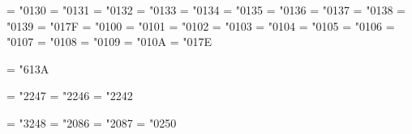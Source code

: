 


\def\daghex  {86}  %
\def\ddaghex {87}
\def\Shex    {A7}
\def\Phex    {B6}
\def\barhex  {16}
\def\gravehex{12}
\def\acutehex{13}
\def\checkhex{14}
\def\brevehex{15}
\def\hathex  {5E}
\def\dothex  {05}
\def\tildehex{7E}
\def\ddothex {7F}



\mathchardef\Gamma         = "0130
\mathchardef\Delta         = "0131
\mathchardef\Theta         = "0132
\mathchardef\Lambda        = "0133
\mathchardef\Xi            = "0134
\mathchardef\Pi            = "0135
\mathchardef\Sigma         = "0136
\mathchardef\Upsilon       = "0137
\mathchardef\Phi           = "0138
\mathchardef\Psi           = "0139
\mathchardef\Omega         = "017F
\mathchardef\varGamma      = "0100
\mathchardef\varDelta      = "0101
\mathchardef\varTheta      = "0102
\mathchardef\varLambda     = "0103
\mathchardef\varXi         = "0104
\mathchardef\varPi         = "0105
\mathchardef\varSigma      = "0106
\mathchardef\varUpsilon    = "0107
\mathchardef\varPhi        = "0108
\mathchardef\varPsi        = "0109
\mathchardef\varOmega      = "010A
\mathchardef\varkappa      = "017E

\mathchardef\ldotp         = "613A

\mathchardef\triangleleft  = "2247
\mathchardef\triangleright = "2246
\mathchardef\comp          = "2242

\mathchardef\Relbar        = "3248
\mathchardef\dagger        = "20\daghex    %
\mathchardef\ddagger       = "20\ddaghex   %
\mathchardef\dotacc        = "0250

